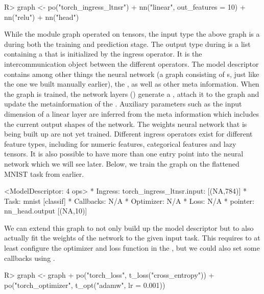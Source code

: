 \documentclass[article]{jss}
\theoremstyle{definition}
\begin{document}
\begin{CodeInput}
R> graph <- po("torch_ingress_ltnsr") %
+    nn("linear", out_features = 10) %
+    nn("relu") %
+    nn("head")
\end{CodeInput}

While the module graph operated on tensors, the input type the above graph is a  during both the training and prediction stage.
The output type during  is a list containing a  that is initialized by the ingress operator.
It is the intercommunication object between the different  operators.
The model descriptor contains among other things the neural network (a graph consisting of s, just like the one we built manually earlier), the , as well as other meta information.
When the graph is trained, the network layers () generate a , attach it to the graph and update the metainformation of the .
Auxiliary parameters such as the input dimension of a linear layer are inferred from the meta information which includes the current output shapes of the network.
The weights neural network that is being built up are not yet trained.
Different ingress operators exist for different feature types, including for numeric features, categorical features and lazy tensors.
It is also possible to have more than one entry point into the neural network which we will see later.
Below, we train the graph on the flattened MNIST task from earlier.

\begin{CodeOutput}
<ModelDescriptor: 4 ops>
* Ingress:  torch_ingress_ltnsr.input: [(NA,784)]
* Task:  mnist [classif]
* Callbacks:  N/A
* Optimizer:  N/A
* Loss:  N/A
* pointer:  nn_head.output [(NA,10)]
\end{CodeOutput}

We can extend this graph to not only build up the model descriptor but to also actually fit the weights of the network to the given input task.
This requires to at least configure the optimizer and loss function in the , but we could also set some callbacks using .

\begin{CodeInput}
R> graph <- graph %
+    po("torch_loss", t_loss("cross_entropy")) %
+    po("torch_optimizer", t_opt("adamw", lr = 0.001))
\end{CodeInput}
\end{document}
